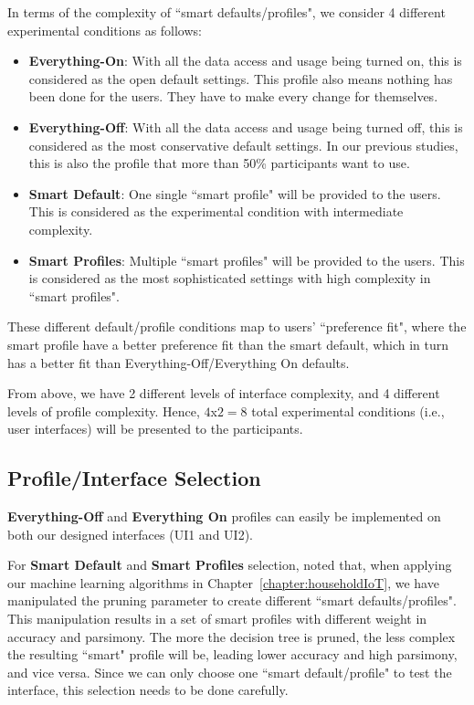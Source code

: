 In terms of the complexity of ``smart defaults/profiles", we consider 4 different experimental conditions as follows:
\begin{itemize}
	\item \textbf{Everything-On}: With all the data access and usage being turned on, this is considered as the open default settings. This profile also means nothing has been done for the users. They have to make every change for themselves.
	\item \textbf{Everything-Off}: With all the data access and usage being turned off, this is considered as the most conservative default settings. In our previous studies, this is also the profile that more than 50\% participants want to use.
	\item \textbf{Smart Default}: One single ``smart profile" will be provided to the users. This is considered as the experimental condition with intermediate complexity.
	\item \textbf{Smart Profiles}: Multiple ``smart profiles" will be provided to the users. This is considered as the most sophisticated settings with high complexity in ``smart profiles".
\end{itemize}

These different default/profile conditions map to users' ``preference fit", where the smart profile have a better preference fit than the smart default, which in turn has a better fit than Everything-Off/Everything On defaults.

From above, we have 2 different levels of interface complexity, and 4 different levels of profile complexity.
Hence, $4$x$2=8$ total experimental conditions (i.e., user interfaces) will be presented to the participants. 

\subsection{Profile/Interface Selection}
\textbf{Everything-Off} and \textbf{Everything On} profiles can easily be implemented on both our designed interfaces (UI1 and UI2).

For \textbf{Smart Default} and \textbf{Smart Profiles} selection, noted that, when applying our machine learning algorithms in Chapter~\ref{chapter:householdIoT}, we have manipulated the pruning parameter to create different ``smart defaults/profiles". This manipulation results in a set of smart profiles with different weight in accuracy and parsimony. The more the decision tree is pruned, the less complex the resulting ``smart" profile will be, leading lower accuracy and high parsimony, and vice versa. Since we can only choose one ``smart default/profile" to test the interface, this selection needs to be done carefully.

